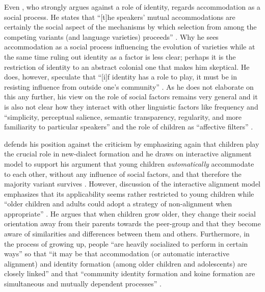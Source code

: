 Even \citet{Mufwene2008}, who strongly argues against a role of identity, regards accommodation as a social process. He states that “[t]he speakers’ mutual accommodations are certainly the social aspect of the mechanisms by which selection from among the competing variants (and language varieties) proceeds” \citep[257]{Mufwene2008}. Why he sees accommodation as a social process influencing the evolution of varieties while at the same time ruling out identity as a factor is less clear; perhaps it is the restriction of identity to an abstract colonial one that makes him skeptical. He does, however, speculate that “[i]f identity has a role to play, it must be in resisting influence from outside one’s community” \citep[258]{Mufwene2008}. As he does not elaborate on this any further, his view on the role of social factors remains very general and it is also not clear how they interact with other linguistic factors like frequency and “simplicity, perceptual salience, semantic transparency, regularity, and more familiarity to particular speakers” \citep[257]{Mufwene2008} and the role of children as “affective filters” \citep[258]{Mufwene2008}.

\citet{Trudgill2008b} defends his position against the criticism by emphasizing again that children play the crucial role in new-dialect formation and he draws on  interactive alignment model to support his argument that young children \emph{automatically} accommodate to each other, without any influence of social factors, and that therefore the majority variant survives \citep[279]{Trudgill2008b}. However,  discussion of the interactive alignment model emphasizes that its applicability seems rather restricted to young children while “older children and adults could adopt a strategy of non-alignment when appropriate” \citep[261]{Tuten2008}. He argues that when children grow older, they change their social orientation away from their parents towards the peer-group and that they become aware of similarities and differences between them and others. Furthermore, in the process of growing up, people “are heavily socialized to perform in certain ways” \citep[260]{Tuten2008} so that “it may be that accommodation (or automatic interactive alignment) and identity formation (among older children and adolescents) are closely linked” and that “community identity formation and koine formation are simultaneous and mutually dependent processes” \citep[261]{Tuten2008}.

